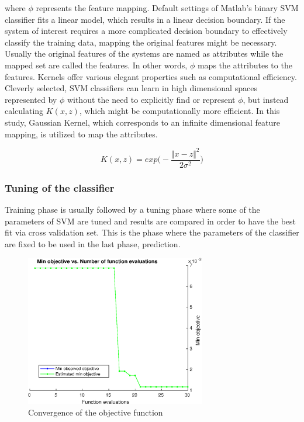where $\phi$ represents the feature mapping. 
Default settings of Matlab's binary SVM classifier fits a linear model, which results in a linear decision boundary. 
If the system of interest requires a more complicated decision boundary to effectively classify the training data, mapping the original features might be necessary. 
Usually the original features of the systems are named as attributes while the mapped set are called the features. 
In other words, $\phi$ maps the attributes to the features. Kernels offer various elegant properties such as computational efficiency. 
Cleverly selected, SVM classifiers can learn in high dimensional spaces represented by $\phi$ without the need to explicitly find or represent $\phi$, but instead calculating $K(x,z)$, which might be computationally more efficient. 
In this study, Gaussian Kernel, which corresponds to an infinite dimensional feature mapping, is utilized to map the attributes.

\begin{equation}
K (x,z) = exp \bigg(-\frac{\Vert x - z \Vert ^ 2}{2 \sigma^2} \bigg)
\end{equation}

\subsubsection{Tuning of the classifier}

Training phase is usually followed by a tuning phase where some of the parameters of SVM are tuned and results are compared in order to have the best fit via cross validation set. This is the phase where the parameters of the classifier are fixed to be used in the last phase, prediction.

\begin{figure}
\begin{center}
\includegraphics[width=0.7\textwidth]{figures/objectiveFuncEval}    %
\caption{Convergence of the objective function} 
\label{fig:objectiveFuncEval}
\end{center}
\end{figure}

